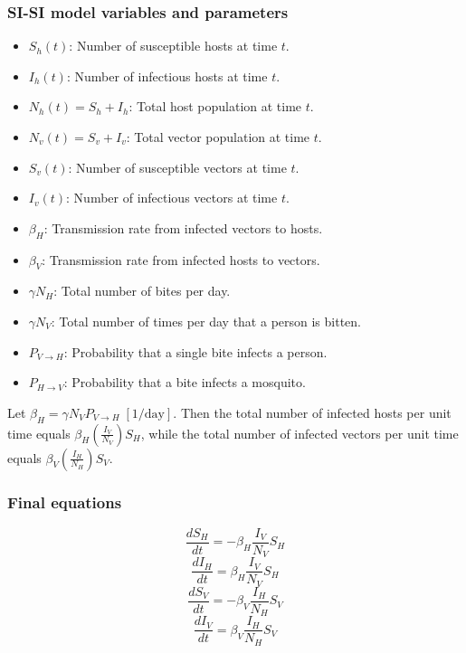 \subsubsection{SI-SI model variables and parameters}
\begin{itemize}
    \item $S_h(t)$: Number of susceptible hosts at time $t$.
    \item $I_h(t)$: Number of infectious hosts at time $t$.
    \item $N_h(t) = S_h + I_h$: Total host population at time $t$.
    \item $N_v(t) = S_v + I_v$: Total vector population at time $t$.
    \item $S_v(t)$: Number of susceptible vectors at time $t$.
    \item $I_v(t)$: Number of infectious vectors at time $t$.
    \item $\beta_H$: Transmission rate from infected vectors to hosts.
    \item $\beta_V$: Transmission rate from infected hosts to vectors.
    \item $\gamma N_H$: Total number of bites per day. 
    \item $\gamma N_V$: Total number of times per day that a person is bitten. 
    \item $P_{V \to H}$: Probability that a single bite infects a person.
    \item $P_{H \to V}$: Probability that a bite infects a mosquito.
\end{itemize}
Let $\beta_H = \gamma N_V P_{V \to H} \; [\text{1/day}]$. Then the total number of infected hosts per unit time equals $\beta_H \left( \frac{I_V}{N_V} \right) S_H$, while the total number of infected vectors per unit time equals $\beta_V \left( \frac{I_H}{N_H} \right) S_V$.
\subsubsection{Final equations}
\begin{equation}
\frac{dS_H}{dt} = -\beta_{H} \frac{I_V}{N_V} S_H
\end{equation}
\begin{equation}
\frac{dI_H}{dt} = \beta_{H} \frac{I_V}{N_V} S_H
\end{equation}
\begin{equation}
\frac{dS_V}{dt} = -\beta_{V} \frac{I_H}{N_H} S_V
\end{equation}
\begin{equation}
\frac{dI_V}{dt} = \beta_{V} \frac{I_H}{N_H} S_V
\end{equation}


